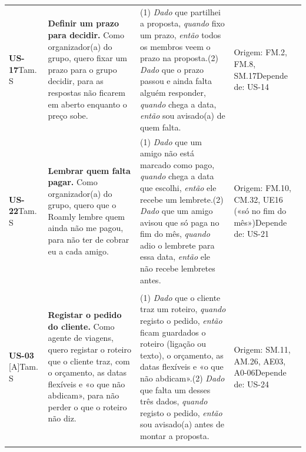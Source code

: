 {\begin{longtable}{@{}p{1.5cm}p{5.1cm}p{5.2cm}p{3.6cm}@{}}
\textbf{US-17}\newline Tam. S & \textbf{Definir um prazo para decidir.} Como organizador(a) do grupo, quero fixar um prazo para o grupo decidir, para as respostas não ficarem em aberto enquanto o preço sobe. & (1) \textit{Dado} que partilhei a proposta, \textit{quando} fixo um prazo, \textit{então} todos os membros veem o prazo na proposta.\newline (2) \textit{Dado} que o prazo passou e ainda falta alguém responder, \textit{quando} chega a data, \textit{então} sou avisado(a) de quem falta. & Origem: FM.2, FM.8, SM.17\newline Depende de: US-14 \\ \addlinespace
\textbf{US-22}\newline Tam. S & \textbf{Lembrar quem falta pagar.} Como organizador(a) do grupo, quero que o Roamly lembre quem ainda não me pagou, para não ter de cobrar eu a cada amigo. & (1) \textit{Dado} que um amigo não está marcado como pago, \textit{quando} chega a data que escolhi, \textit{então} ele recebe um lembrete.\newline (2) \textit{Dado} que um amigo avisou que só paga no fim do mês, \textit{quando} adio o lembrete para essa data, \textit{então} ele não recebe lembretes antes. & Origem: FM.10, CM.32, UE16 («só no fim do mês»)\newline Depende de: US-21 \\ \addlinespace
\midrule
\multicolumn{4}{@{}l}{\textbf{Release 3 — Versão para agências}} \\ \midrule
\textbf{US-03} [A]\newline Tam. S & \textbf{Registar o pedido do cliente.} Como agente de viagens, quero registar o roteiro que o cliente traz, com o orçamento, as datas flexíveis e «o que não abdicam», para não perder o que o roteiro não diz. & (1) \textit{Dado} que o cliente traz um roteiro, \textit{quando} registo o pedido, \textit{então} ficam guardados o roteiro (ligação ou texto), o orçamento, as datas flexíveis e «o que não abdicam».\newline (2) \textit{Dado} que falta um desses três dados, \textit{quando} registo o pedido, \textit{então} sou avisado(a) antes de montar a proposta. & Origem: SM.11, AM.26, AE03, A0-06\newline Depende de: US-24 \\ \addlinespace

\end{longtable}}

